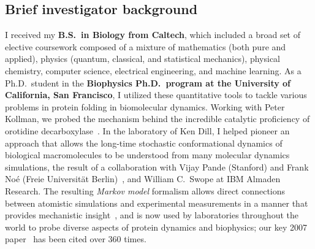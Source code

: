 \documentclass[10pt]{article}
\begin{document}
\subsection*{Brief investigator background}

I received my {\bf B.S.~in Biology from Caltech}, which included a broad set of elective coursework composed of a mixture of mathematics (both pure and applied), physics (quantum, classical, and statistical mechanics), physical chemistry, computer science, electrical engineering, and machine learning.  
As a Ph.D.~student in the {\bf Biophysics Ph.D.~program at the University of California, San Francisco}, I utilized these quantitative tools to tackle various problems in protein folding in biomolecular dynamics.
Working with Peter Kollman, we probed the mechanism behind the incredible catalytic proficiency of orotidine decarboxylase~\cite{lee-chong-chodera-kollman:2001:jacs:odcase}.
In the laboratory of Ken Dill, I helped pioneer an approach that allows the long-time stochastic conformational dynamics of biological macromolecules to be understood from many molecular dynamics simulations, the result of a collaboration with Vijay Pande (Stanford) and Frank No\'{e} (Freie Universit\"{a}t Berlin)~\cite{chodera:2006:mms:long-time-dynamics,chodera:jcp:2007,bacallado:2009:jcp:detailed-balance-constraint,temperature-dependent-markov-models,noe:pnas:2011:dynamical-fingerprints,noe:jcp:2011:msm-review}, and William C.~Swope at IBM Almaden Research.
The resulting \emph{Markov model} formalism allows direct connections between atomistic simulations and experimental measurements in a manner that provides mechanistic insight~\cite{chodera:2006:mms:long-time-dynamics,chodera:jcp:2007}, and is now used by laboratories throughout the world to probe diverse aspects of protein dynamics and biophysics; our key 2007 paper~\cite{chodera:jcp:2007} has been cited over 360 times.
\end{document}
